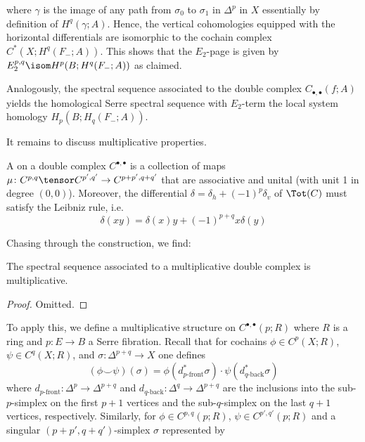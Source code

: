 where $\gamma$ is the image of any path from $\sigma_0$ to $\sigma_1$ in $\Delta^p$ in $X$ essentially by definition of $H^q(\gamma; A)$.
Hence, the vertical cohomologies equipped with the horizontal differentials are isomorphic to the cochain complex $C^*(X; H^q(F_{-}; A))$.
This shows that the $E_2$-page is given by $E_2^{p, q} \isom H^p(B; H^q(F_{-}; A))$ as claimed.

Analogously, the spectral sequence associated to the double complex $C_{\bullet, \bullet}(f; A)$ yields the homological Serre spectral sequence with $E_2$-term the local system homology $H_p(B; H_q(F_{-}; A))$.

It remains to discuss multiplicative properties.
\begin{definition}
	A  on a double complex $C^{\bullet, \bullet}$ is a collection of maps $\mu\colon C^{p, q} \tensor C^{p', q'} \to C^{p + p', q + q'}$ that are associative and unital (with unit 1 in degree $(0, 0)$).
	Moreover, the differential $\delta = \delta_h + (-1)^p \delta_v$ of $\Tot(C)$ must satisfy the Leibniz rule, i.e.
	\begin{equation*}
		\delta(xy) = \delta(x)y + (-1)^{p + q} x \delta(y)
	\end{equation*}
\end{definition}
Chasing through the construction, we find:
\begin{proposition}
	The spectral sequence associated to a multiplicative double complex is multiplicative.
\end{proposition}
\begin{proof}
	Omitted.
\end{proof}
To apply this, we define a multiplicative structure on $C^{\bullet, \bullet}(p; R)$ where $R$ is a ring and $p\colon E \to B$ a Serre fibration.
Recall that for cochains $\phi \in C^p(X; R)$, $\psi \in C^q(X; R)$, and $\sigma\colon \Delta^{p + q} \to X$ one defines
\begin{equation*}
	(\phi \smile \psi)(\sigma) = \phi(d_{p\text{-front}}^* \sigma) \cdot \psi(d_{q\text{-back}}^* \sigma)
\end{equation*}
where $d_{p\text{-front}}\colon \Delta^p \to \Delta^{p + q}$ and $d_{q\text{-back}}\colon \Delta^q \to \Delta^{p + q}$ are the inclusions into the sub-$p$-simplex on the first $p + 1$ vertices and the sub-$q$-simplex on the last $q + 1$ vertices, respectively.
Similarly, for $\phi \in C^{p, q}(p; R)$, $\psi \in C^{p', q'}(p; R)$ and a singular $(p + p', q + q')$-simplex $\sigma$ represented by
